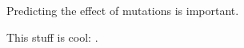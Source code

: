 
Predicting the effect of mutations is important. 

\cite{pleasance_comprehensive_2010}

\cite{tennessen_evolution_2012}

\cite{lee_mutation_2010}

This stuff is cool: \cite{montelione_protein_2012}.
